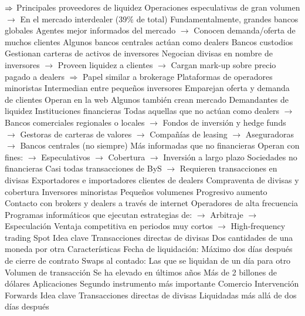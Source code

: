 \documentclass{nuevotema}
\begin{document}
\begin{esquemal}
				\4[] $\Rightarrow$ Principales proveedores de liquidez
				\4[] Operaciones especulativas de gran volumen
				\4[] $\to$ En el mercado interdealer (39\% de total)
				\4[] Fundamentalmente, grandes bancos globales
				\4[] Agentes mejor informados del mercado
				\4[] $\to$ Conocen demanda/oferta de muchos clientes
				\4[] Algunos bancos centrales actúan como dealers
				\4 Bancos custodios
				\4[] Gestionan carteras de activos de inversores
				\4[] Negocian divisas en nombre de inversores
				\4[] $\to$ Proveen liquidez a clientes
				\4[] $\to$ Cargan mark-up sobre precio pagado a dealers
				\4[] $\Rightarrow$ Papel similar a brokerage
				\4 Plataformas de operadores minoristas
				\4[] Intermedian entre pequeños inversores
				\4[] Emparejan oferta y demanda de clientes
				\4[] Operan en la web
				\4[] Algunos también crean mercado
			\3 Demandantes de liquidez
				\4 Instituciones financieras
				\4[] Todas aquellas que no actúan como dealers
				\4[] $\to$ Bancos comerciales regionales o locales
				\4[] $\to$ Fondos de inversión y hedge funds
				\4[] $\to$ Gestoras de carteras de valores
				\4[] $\to$ Compañías de leasing
				\4[] $\to$ Aseguradoras
				\4[] $\to$ Bancos centrales (no siempre)
				\4[] Más informadas que no financieras
				\4[] Operan con fines:
				\4[] $\to$ Especulativos
				\4[] $\to$ Cobertura
				\4[] $\to$ Inversión a largo plazo
				\4 Sociedades no financieras
				\4[] Casi todas transacciones de ByS
				\4[] $\to$ Requieren transacciones en divisas
				\4[] Exportadores e importadores clientes de dealers
				\4[] Compraventa de divisas y cobertura
				\4 Inversores minoristas
				\4[] Pequeños volumenes
				\4[] Progresivo aumento
				\4[] Contacto con brokers y dealers a través de internet
				\4 Operadores de alta frecuencia
				\4[] Programas informáticos que ejecutan estrategias de:
				\4[] $\to$ Arbitraje
				\4[] $\to$ Especulación
				\4[] Ventaja competitiva en periodos muy cortos
				\4[] $\to$ High-frequency trading
	\1 
		\2 Spot
			\3 Idea clave
				\4 Transacciones directas de divisas
				\4[] Dos cantidades de una moneda por otra
			\3 Características
				\4 Fecha de liquidación:
				\4[] Máximo dos días después de cierre de contrato
				\4 Swaps al contado:
				\4[] Las que se liquidan de un día para otro
				\4 Volumen de transacción
				\4[] Se ha elevado en últimos años
				\4[] Más de 2 billones de dólares
			\3 Aplicaciones
				\4 Segundo instrumento más importante
				\4 Comercio
				\4 Intervención
		\2 Forwards
			\3 Idea clave
				\4 Transacciones directas de divisas
				\4[] Liquidadas más allá de dos días después

\end{esquemal}
\end{document}
